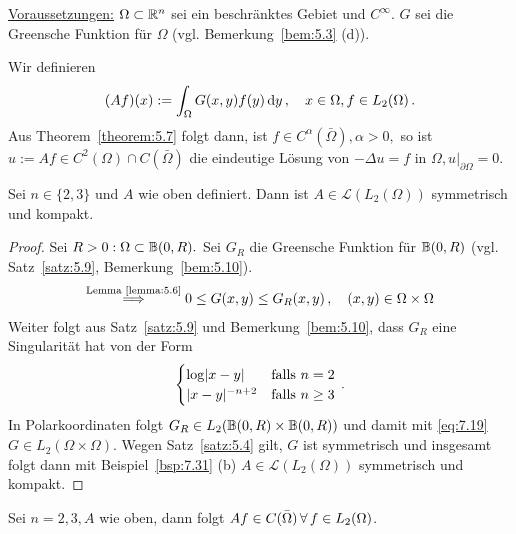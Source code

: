 \underline{Voraussetzungen:} $\Omega \subset \mathbb{R}^n$ sei ein beschränktes Gebiet und $C^\infty$. $G$ sei die Greensche Funktion für $\Omega$ (vgl. Bemerkung~\ref{bem:5.3} (d)).

Wir definieren
\[
	(Af)(x) := \int_\Omega G(x,y) f(y) \,\mathrm{d} y \, , \quad x \in \Omega, f \in L_2(\Omega) \, .
\]
Aus Theorem~\ref{theorem:5.7} folgt dann, ist $f\in C^\alpha (\bar\Omega), \alpha >0,$ so ist $u := Af \in C^2(\Omega ) \cap C(\bar\Omega)$ die eindeutige Lösung von $-\Delta u = f$ in $\Omega, u\vert_{\partial \Omega} = 0$.

\begin{lemma}\label{lemma:7.36}
Sei $n \in \{2,3\}$ und $A$ wie oben definiert. Dann ist $A \in \mathcal L(L_2(\Omega))$ symmetrisch und kompakt.
\end{lemma}

\begin{proof}
Sei $R>0 : \Omega \subset \mathbb{B} (0,R).$ Sei $G_R$ die Greensche Funktion für $\mathbb{B}(0,R)$ (vgl. Satz~\ref{satz:5.9}, Bemerkung~\ref{bem:5.10}).
\begin{align}\label{eq:7.19}
\stackrel{\scriptsize\text{Lemma}~\ref{lemma:5.6}}\Longrightarrow 0 \leq G(x,y) \leq G_R(x,y) \, , \quad (x,y) \in \Omega \times \Omega
\end{align}
Weiter folgt aus Satz~\ref{satz:5.9} und Bemerkung~\ref{bem:5.10}, dass $G_R$ eine Singularität hat von der Form
\begin{align*} 
	\begin{cases}
		\log \lvert x-y\rvert & \text{falls } n=2 \\
		\lvert x-y\rvert^{-n+2} & \text{falls } n\geq 3
	\end{cases} \, .
\end{align*}
In Polarkoordinaten folgt $G_R \in L_2(\mathbb{B}(0,R) \times \mathbb{B}(0,R))$ und damit mit \eqref{eq:7.19} $G \in L_2(\Omega \times \Omega)$. Wegen Satz~\ref{satz:5.4} gilt, $G$ ist symmetrisch und insgesamt folgt dann mit Beispiel~\ref{bsp:7.31} (b) $A \in \mathcal L(L_2(\Omega))$ symmetrisch und kompakt.
\end{proof}

\begin{lemma}
Sei $n = 2,3, A$ wie oben, dann folgt $Af \in C(\bar\Omega) \, \forall \, f \in L_2(\Omega)$.
\end{lemma}

